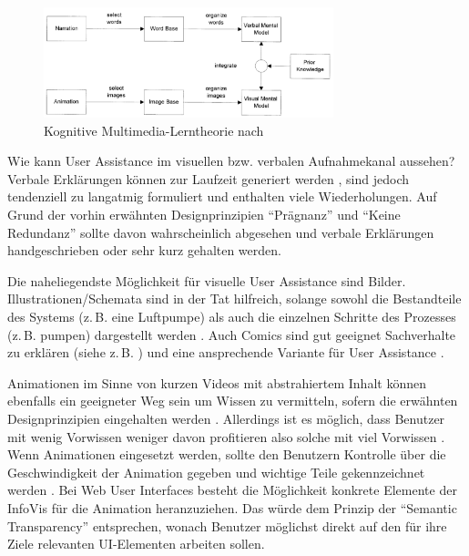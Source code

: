 \documentclass[
	headsepline,
	footsepline,
	fontsize=12pt,
	bibliography=totoc
]{scrbook}
\begin{document}
\begin{figure}[htbp]
   \centering
   \includegraphics[width=0.75\textwidth]{images/grundlagen-kognitive_multimedia_lerntheorie.png}
   \caption{Kognitive Multimedia-Lerntheorie nach \cite{Mayer2002}}
   \label{figure:kognitive_multimedia_lerntheorie}
\end{figure}


Wie kann User Assistance im visuellen bzw. verbalen Aufnahmekanal aussehen? Verbale Erklärungen können zur Laufzeit generiert werden \cite{Bauer2011, Gesell2012, Matheson2012}, sind jedoch tendenziell zu langatmig formuliert und enthalten viele Wiederholungen. Auf Grund der vorhin erwähnten Designprinzipien \enquote{Prägnanz} und \enquote{Keine Redundanz} sollte davon wahrscheinlich abgesehen und verbale Erklärungen handgeschrieben oder sehr kurz gehalten werden.

Die naheliegendste Möglichkeit für visuelle User Assistance sind Bilder. Illustrationen/Schemata sind in der Tat hilfreich, solange sowohl die Bestandteile des Systems (z.\,B. eine Luftpumpe) als auch die einzelnen Schritte des Prozesses (z.\,B. pumpen) dargestellt werden \cite{Mayer1990}. Auch Comics sind gut geeignet Sachverhalte zu erklären (siehe z.\,B. \cite{McCloud1994, McCloud2008}) und eine ansprechende Variante für User Assistance \cite{Webb2012}.

Animationen im Sinne von kurzen Videos mit abstrahiertem Inhalt können ebenfalls ein geeigneter Weg sein um Wissen zu vermitteln, sofern die erwähnten Designprinzipien eingehalten werden \cite{Mayer2002a}. Allerdings ist es möglich, dass Benutzer mit wenig Vorwissen weniger davon profitieren also solche mit viel Vorwissen \cite{Kalyuga2008}. Wenn Animationen eingesetzt werden, sollte den Benutzern Kontrolle über die Geschwindigkeit der Animation gegeben und wichtige Teile gekennzeichnet werden \cite{Wong2011}. Bei Web User Interfaces besteht die Möglichkeit konkrete Elemente der InfoVis für die Animation heranzuziehen. Das würde dem Prinzip der \enquote{Semantic Transparency} \cite{Kohlhase2009} entsprechen, wonach Benutzer möglichst direkt auf den für ihre Ziele relevanten UI-Elementen arbeiten sollen.
\end{document}
